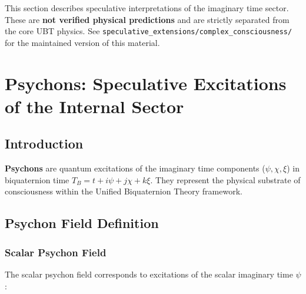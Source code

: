 

\begin{tcolorbox}[colback=red!5!white,colframe=red!75!black,title=Speculative Content — Not Core Physics]
This section describes speculative interpretations of the imaginary time sector.
These are \textbf{not verified physical predictions} and are strictly separated from
the core UBT physics.  See \texttt{speculative\_extensions/complex\_consciousness/}
for the maintained version of this material.
\end{tcolorbox}

\section{Psychons: Speculative Excitations of the Internal Sector}
\label{sec:canonical:psychons}

\subsection{Introduction}

\textbf{Psychons} are quantum excitations of the imaginary time components ($\psi, \chi, \xi$) in biquaternion time $T_B = t + i\psi + j\chi + k\xi$. They represent the physical substrate of consciousness within the Unified Biquaternion Theory framework.

\subsection{Psychon Field Definition}

\subsubsection{Scalar Psychon Field}

The scalar psychon field corresponds to excitations of the scalar imaginary time $\psi$:

